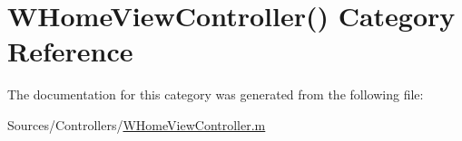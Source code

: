 \hypertarget{category_w_home_view_controller_07_08}{\section{W\-Home\-View\-Controller() Category Reference}
\label{category_w_home_view_controller_07_08}
}


The documentation for this category was generated from the following file\-:\begin{DoxyCompactItemize}
\item 
Sources/\-Controllers/\hyperlink{_w_home_view_controller_8m}{W\-Home\-View\-Controller.\-m}\end{DoxyCompactItemize}
